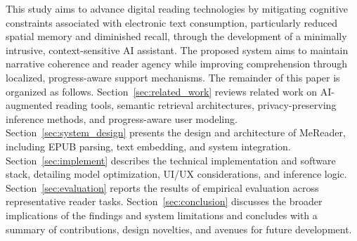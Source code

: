 This study aims to advance digital reading technologies by mitigating cognitive constraints associated with electronic text consumption, particularly reduced spatial memory and diminished recall, through the development of a minimally intrusive, context-sensitive AI assistant. The proposed system aims to maintain narrative coherence and reader agency while improving comprehension through localized, progress-aware support mechanisms. 
The remainder of this paper is organized as follows. Section~\ref{sec:related_work} reviews related work on AI-augmented reading tools, semantic retrieval architectures, privacy-preserving inference methods, and progress-aware user modeling. Section~\ref{sec:system_design} presents the design and architecture of MeReader, including EPUB parsing, text embedding, and system integration. Section~\ref{sec:implement} describes the technical implementation and software stack, detailing model optimization, UI/UX considerations, and inference logic. Section~\ref{sec:evaluation} reports the results of empirical evaluation across representative reader tasks. Section~\ref{sec:conclusion} discusses the broader implications of the findings and system limitations and concludes with a summary of contributions, design novelties, and avenues for future development.